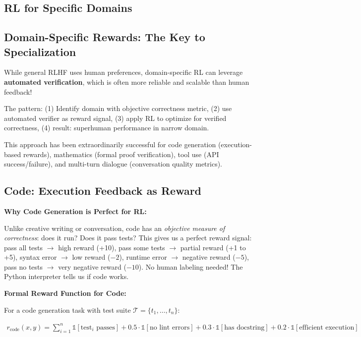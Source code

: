 \begin{chapterenv}

\chapter{RL for Specific Domains}

\section{Domain-Specific Rewards: The Key to Specialization}

While general RLHF uses human preferences, domain-specific RL can leverage \textbf{automated verification}, which is often more reliable and scalable than human feedback!

The pattern: (1) Identify domain with objective correctness metric, (2) use automated verifier as reward signal, (3) apply RL to optimize for verified correctness, (4) result: superhuman performance in narrow domain.

This approach has been extraordinarily successful for code generation (execution-based rewards), mathematics (formal proof verification), tool use (API success/failure), and multi-turn dialogue (conversation quality metrics).

\section{Code: Execution Feedback as Reward}

\begin{infobox}
\textbf{Why Code Generation is Perfect for RL:}

Unlike creative writing or conversation, code has an \textit{objective measure of correctness}: does it run? Does it pass tests? This gives us a perfect reward signal: pass all tests $\to$ high reward (+10), pass some tests $\to$ partial reward (+1 to +5), syntax error $\to$ low reward ($-2$), runtime error $\to$ negative reward ($-5$), pass no tests $\to$ very negative reward ($-10$). No human labeling needed! The Python interpreter tells us if code works.
\end{infobox}

\begin{infobox}
\textbf{Formal Reward Function for Code:}

For a code generation task with test suite $\mathcal{T} = \{t_1, \ldots, t_n\}$:

\begin{align*}
r_{\text{code}}(x, y) = \sum_{i=1}^n \mathbb{1}[\text{test}_i \text{ passes}] + 0.5 \cdot \mathbb{1}[\text{no lint errors}] + 0.3 \cdot \mathbb{1}[\text{has docstring}] + 0.2 \cdot \mathbb{1}[\text{efficient execution}]
\end{align*}


\end{infobox}
\end{chapterenv}
